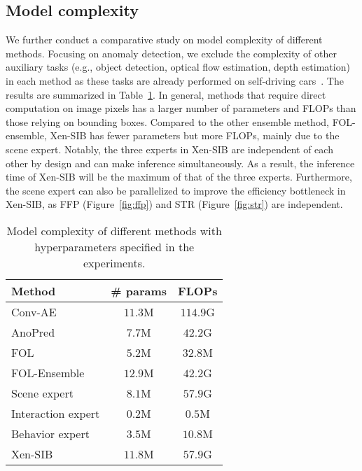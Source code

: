 \subsection{Model complexity}
We further conduct a comparative study on model complexity of different methods. Focusing on anomaly detection, we exclude the complexity of other auxiliary tasks (e.g., object detection, optical flow estimation, depth estimation) in each method as these tasks are already performed on self-driving cars~\citep{shi2022csflow,godard2019digging,du2020online}. The results are summarized in Table~\ref{table:model-complexity}. In general, methods that require direct computation on image pixels has a larger number of parameters and FLOPs than those relying on bounding boxes. Compared to the other ensemble method, FOL-ensemble, Xen-SIB has fewer parameters but more FLOPs, mainly due to the scene expert. Notably, the three experts in Xen-SIB are independent of each other by design and can make inference simultaneously. As a result, the inference time of Xen-SIB will be the maximum of that of the three experts. Furthermore, the scene expert can also be parallelized to improve the efficiency bottleneck in Xen-SIB, as FFP (Figure~\ref{fig:ffp}) and STR (Figure~\ref{fig:str}) are independent.

\begin{table}[t]
  \begin{center}
    \caption{Model complexity of different methods with hyperparameters specified in the experiments.}
    \label{table:model-complexity}
    \begin{tabular}{  l  c  c  }
      \toprule
      Method & \# params & FLOPs \\
      \midrule
      Conv-AE & $11.3$M & $114.9$G \\
      AnoPred & $7.7$M & $42.2$G \\
      FOL & $5.2$M & $32.8$M \\
      FOL-Ensemble & $12.9$M & $42.2$G \\
      \midrule
      Scene expert & $8.1$M & $57.9$G \\
      Interaction expert & $0.2$M & $0.5$M \\
      Behavior expert & $3.5$M & $10.8$M \\
      \midrule
      Xen-SIB & $11.8$M & $57.9$G \\
      \bottomrule
    \end{tabular}
  \end{center}
\end{table}

